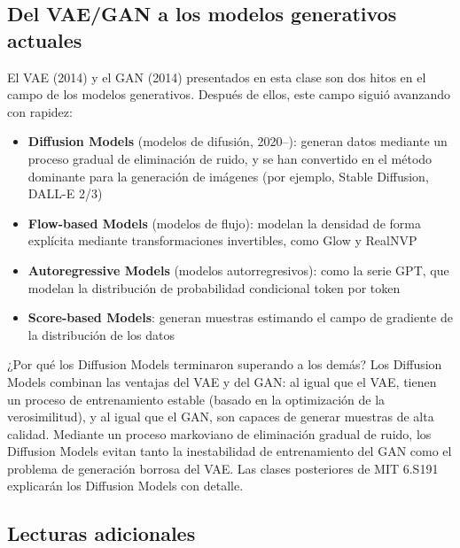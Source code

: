 \documentclass[a4paper]{article}
\begin{document}
\subsection{Del VAE/GAN a los modelos generativos actuales}

El VAE (2014) y el GAN (2014) presentados en esta clase son dos hitos en el campo de los modelos generativos. Después de ellos, este campo siguió avanzando con rapidez:

\begin{itemize}
    \item \textbf{Diffusion Models} (modelos de difusión, 2020--): generan datos mediante un proceso gradual de eliminación de ruido, y se han convertido en el método dominante para la generación de imágenes (por ejemplo, Stable Diffusion, DALL-E 2/3)
    \item \textbf{Flow-based Models} (modelos de flujo): modelan la densidad de forma explícita mediante transformaciones invertibles, como Glow y RealNVP
    \item \textbf{Autoregressive Models} (modelos autorregresivos): como la serie GPT, que modelan la distribución de probabilidad condicional token por token
    \item \textbf{Score-based Models}: generan muestras estimando el campo de gradiente de la distribución de los datos
\end{itemize}

\begin{knowledgebox}{¿Por qué los Diffusion Models terminaron superando a los demás?}
Los Diffusion Models combinan las ventajas del VAE y del GAN: al igual que el VAE, tienen un proceso de entrenamiento estable (basado en la optimización de la verosimilitud), y al igual que el GAN, son capaces de generar muestras de alta calidad. Mediante un proceso markoviano de eliminación gradual de ruido, los Diffusion Models evitan tanto la inestabilidad de entrenamiento del GAN como el problema de generación borrosa del VAE. Las clases posteriores de MIT 6.S191 explicarán los Diffusion Models con detalle.
\end{knowledgebox}

\subsection{Lecturas adicionales}
\end{document}
